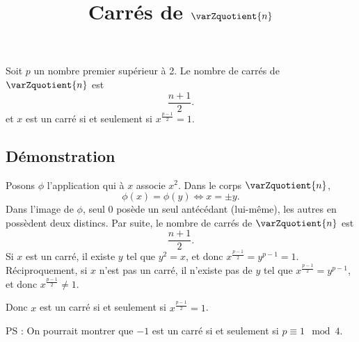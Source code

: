 \documentclass[fontsize=12pt,twoside=false,parskip=half, french]{scrartcl}
\title{Carrés de $\varZquotient{n}$}
\date{}
\author{}
\begin{document}
\maketitle
   \begin{Theoreme}
      Soit $p$ un nombre premier supérieur à 2. Le nombre de carrés de $\varZquotient{n}$ est
      \[
         \frac{n + 1}{2}.
      \]
      et $x$ est un carré si et seulement si $x^{\frac{p - 1}{2}} = 1$.
   \end{Theoreme}
   \subsection{Démonstration}
      Posons $\phi$ l’application qui à $x$ associe $x^2$. Dans le corps $\varZquotient{n}$,
      \[
         \phi(x) = \phi(y) \iff x = \pm y.
      \]
      Dans l’image de $\phi$, seul $0$ posède un seul antécédant (lui-même), les autres en possèdent deux distincs. Par suite, 
      le nombre de carrés de $\varZquotient{n}$ est
      \[
         \frac{n + 1}{2}.
      \]
      Si $x$ est un carré, il existe $y$ tel que $y^2 = x$, et donc
      $x^{\frac{p - 1}{2}} = y^{p - 1} = 1$. Réciproquement, si $x$ n'est pas un
      carré, il n'existe pas de $y$ tel que $x^{\frac{p - 1}{2}} = y^{p - 1}$, 
      et donc $x^{\frac{p - 1}{2}} \neq 1$.
      
      Donc $x$ est un carré si et seulement si $x^{\frac{p - 1}{2}} = 1$.
      
      PS : On pourrait montrer que $-1$ est un carré si et seulement si $p \equiv 1 \mod 4$.
\end{document}
